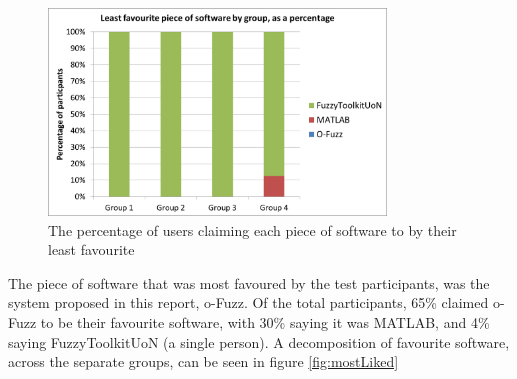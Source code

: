 \begin{figure}[ht!]
	\begin{center}
		\includegraphics[width=0.8\textwidth]{images/leastFav}
	\end{center}
	\vspace{-5mm}
	\captionsetup{justification=centering,margin=2cm}	
	\caption{The percentage of users claiming each piece of software to by their least favourite}
	\label{fig:leastFavour}
	\vspace{-2mm}
\end{figure}
\noindent 
The piece of software that was most favoured by the test participants, was the system proposed in this report, o-Fuzz. Of the total participants, 65\% claimed o-Fuzz to be their favourite software, with 30\% saying it was MATLAB, and 4\% saying FuzzyToolkitUoN (a single person). A decomposition of favourite software, across the separate groups, can be seen in figure \ref{fig:mostLiked}
			
